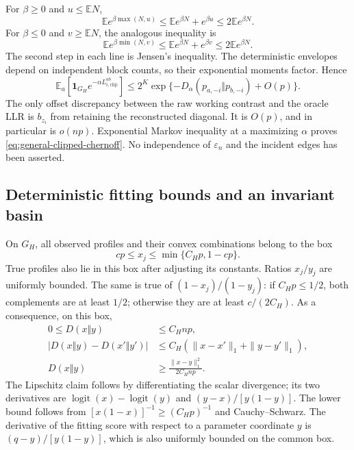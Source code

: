 For $\beta\ge0$ and $u\le\mathbb EN$,
\[
 \mathbb Ee^{\beta\max(N,u)}
 \le\mathbb Ee^{\beta N}+e^{\beta u}
 \le2\mathbb Ee^{\beta N}.
\]
For $\beta\le0$ and $v\ge\mathbb EN$, the analogous inequality is
\[
 \mathbb Ee^{\beta\min(N,v)}
 \le\mathbb Ee^{\beta N}+e^{\beta v}
 \le2\mathbb Ee^{\beta N}.
\]
The second step in each line is Jensen's inequality.  The
deterministic envelopes depend on independent block counts, so
their exponential moments factor.  Hence
\begin{equation}
 \mathbb E_a\left[\mathbf1_{G_H}
        e^{-\alpha L_{i,\mathrm{clip}}^{ab}}\right]
 \le2^K\exp\{-D_\alpha(p_{a,-i}\Vert p_{b,-i})+O(p)\}.
 \label{eq:general-clipped-moment}
\end{equation}
The only offset discrepancy between the raw working contrast and
the oracle LLR is $b_{z_i}$ from retaining the reconstructed
diagonal.  It is $O(p)$, and in particular is $o(np)$.
Exponential Markov inequality at a maximizing $\alpha$ proves
\eqref{eq:general-clipped-chernoff}.  No independence of
$\varepsilon_n$ and the incident edges has been asserted.

\subsection{Deterministic fitting bounds and an invariant basin}
\label{app:general-local-em}

On $G_H$, all observed profiles and their convex combinations
belong to the box
\begin{equation}
 cp\le x_j\le
          \min\{C_Hp,1-cp\}.
 \label{eq:general-common-box}
\end{equation}
True profiles also lie in this box after adjusting its constants.
Ratios $x_j/y_j$ are uniformly bounded.  The same is true of
$(1-x_j)/(1-y_j)$: if $C_Hp\le1/2$, both complements
are at least $1/2$; otherwise they are at least
$c/(2C_H)$.  As a consequence, on this box,
\begin{align}
 0\le D(x\Vert y)&\le C_Hnp,\\
 |D(x\Vert y)-D(x'\Vert y')|
   &\le C_H(\|x-x'\|_1+\|y-y'\|_1),
 \label{eq:general-deviance-lipschitz}\\
 D(x\Vert y)&\ge
                 \frac{\|x-y\|_1^2}{2C_Hnp}.
 \label{eq:general-deviance-coercive}
\end{align}
The Lipschitz claim follows by differentiating the scalar
divergence; its two derivatives are
$\operatorname{logit}(x)-\operatorname{logit}(y)$ and
$(y-x)/[y(1-y)]$.  The lower bound follows from
$[x(1-x)]^{-1}\ge(C_Hp)^{-1}$ and Cauchy--Schwarz.
The derivative of the fitting score with respect to a parameter
coordinate $y$ is $(q-y)/[y(1-y)]$, which is also uniformly bounded
on the common box.

